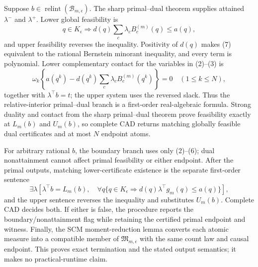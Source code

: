 Suppose \(b\in\operatorname{relint}(\mathcal B_{m,\epsilon})\).  The sharp primal--dual theorem supplies attained \(\lambda^-\) and \(\lambda^+\).  Lower global feasibility is
\[
 q\in K_{\epsilon}\Longrightarrow
 d(q)\sum_c\lambda_cB_c^{(m)}(q)\leq a(q),
\tag{7}
\]
and upper feasibility reverses the inequality.  Positivity of \(d(q)\) makes (7) equivalent to the rational Bernstein minorant inequality, and every term is polynomial.  Lower complementary contact for the variables in (2)--(3) is
\[
 \omega_k\left\{a(q^k)-d(q^k)\sum_c\lambda_cB_c^{(m)}(q^k)\right\}=0
 \quad(1\leq k\leq N),
\tag{8}
\]
together with \(\lambda^{\top}b=t\); the upper system uses the reversed slack.  Thus the relative-interior primal--dual branch is a first-order real-algebraic formula.  Strong duality and contact from the sharp primal--dual theorem prove feasibility exactly at \(L_m(b)\) and \(U_m(b)\), so complete CAD returns matching globally feasible dual certificates and at most \(N\) endpoint atoms.

For arbitrary rational \(b\), the boundary branch uses only (2)--(6); dual nonattainment cannot affect primal feasibility or either endpoint.  After the primal outputs, matching lower-certificate existence is the separate first-order sentence
\[
 \exists\lambda\left[
 \lambda^{\top}b=L_m(b),\quad
 \forall q\{q\in K_{\epsilon}\Rightarrow d(q)\lambda^{\top}g_m(q)\leq a(q)\}
 \right],
\tag{9}
\]
and the upper sentence reverses the inequality and substitutes \(U_m(b)\).  Complete CAD decides both.  If either is false, the procedure reports the boundary/nonattainment flag while retaining the certified primal endpoint and witness.  Finally, the SCM moment-reduction lemma converts each atomic measure into a compatible member of \(\mathfrak M_{m,\epsilon}\) with the same count law and causal endpoint.  This proves exact termination and the stated output semantics; it makes no practical-runtime claim.